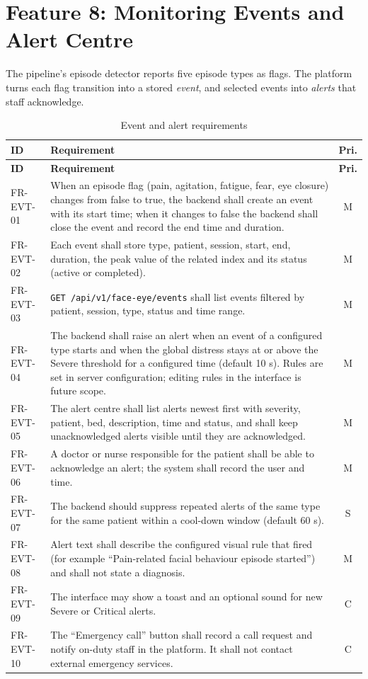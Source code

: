 \documentclass[a4paper,11pt]{scrreprt}
\makeatletter
\newenvironment{reqtable}[1]{%
  \small
  \begin{longtable}{@{}>{\ttfamily\footnotesize}p{2.55cm}>{\raggedright\arraybackslash}p{10.7cm}c@{}}
  \caption{#1}\\
  \toprule \textbf{ID} & \textbf{Requirement} & \textbf{Pri.}\\ \midrule
  \endfirsthead
  \toprule \textbf{ID} & \textbf{Requirement} & \textbf{Pri.}\\ \midrule
  \endhead
  \bottomrule
  \endfoot
}{%
  \end{longtable}\normalsize
}
\newcommand{\req}[3]{#1 & #2 & #3 \\ \midrule}
\newcommand{\code}[1]{\texttt{#1}}
\makeatother
\begin{document}
\section{Feature 8: Monitoring Events and Alert Centre}
The pipeline's episode detector reports five episode types as flags. The platform turns each flag transition into a stored \emph{event}, and selected events into \emph{alerts} that staff acknowledge.
\begin{reqtable}{Event and alert requirements}
\req{FR-EVT-01}{When an episode flag (pain, agitation, fatigue, fear, eye closure) changes from false to true, the backend shall create an event with its start time; when it changes to false the backend shall close the event and record the end time and duration.}{M}
\req{FR-EVT-02}{Each event shall store type, patient, session, start, end, duration, the peak value of the related index and its status (active or completed).}{M}
\req{FR-EVT-03}{\code{GET /api/v1/face-eye/events} shall list events filtered by patient, session, type, status and time range.}{M}
\req{FR-EVT-04}{The backend shall raise an alert when an event of a configured type starts and when the global distress stays at or above the Severe threshold for a configured time (default 10 s). Rules are set in server configuration; editing rules in the interface is future scope.}{M}
\req{FR-EVT-05}{The alert centre shall list alerts newest first with severity, patient, bed, description, time and status, and shall keep unacknowledged alerts visible until they are acknowledged.}{M}
\req{FR-EVT-06}{A doctor or nurse responsible for the patient shall be able to acknowledge an alert; the system shall record the user and time.}{M}
\req{FR-EVT-07}{The backend should suppress repeated alerts of the same type for the same patient within a cool-down window (default 60 s).}{S}
\req{FR-EVT-08}{Alert text shall describe the configured visual rule that fired (for example ``Pain-related facial behaviour episode started'') and shall not state a diagnosis.}{M}
\req{FR-EVT-09}{The interface may show a toast and an optional sound for new Severe or Critical alerts.}{C}
\req{FR-EVT-10}{The ``Emergency call'' button shall record a call request and notify on-duty staff in the platform. It shall not contact external emergency services.}{C}
\end{reqtable}
\end{document}
